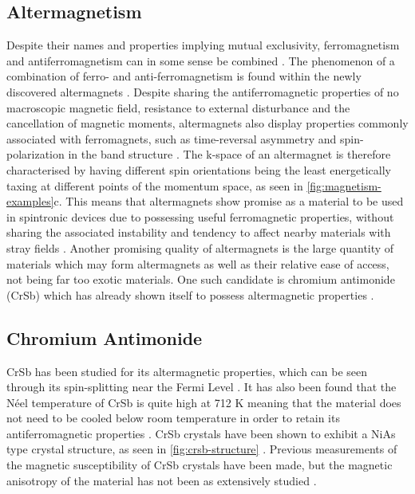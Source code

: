     \subsection{Altermagnetism}
    Despite their names and properties implying mutual exclusivity, ferromagnetism and antiferromagnetism can in some sense be combined 
    \cite{vsmejkal2022emerging}. The phenomenon of a combination of ferro- and anti-ferromagnetism is found within the newly discovered altermagnets 
    \cite{song2025altermagnets}. Despite sharing the antiferromagnetic properties of no macroscopic magnetic field, resistance to external disturbance 
    and the cancellation of magnetic moments, altermagnets also display properties commonly associated with ferromagnets, such as time-reversal 
    asymmetry and spin-polarization in the band structure \cite{vsmejkal2022emerging}. The k-space of an altermagnet is therefore characterised by 
    having different spin orientations being the least energetically taxing at different points of the momentum space, as seen in 
    \autoref{fig:magnetism-examples}c. This means that altermagnets show promise as a material to be used in spintronic devices due to possessing useful 
    ferromagnetic properties, without sharing the associated instability and tendency to affect nearby materials with stray fields 
    \cite{tamang2025altermagnetism}. Another promising quality of altermagnets is the large quantity of materials which may form altermagnets as well as 
    their relative ease of access, not being far too exotic materials. One such candidate is chromium antimonide (CrSb) which has already shown itself to 
    possess altermagnetic properties \cite{peng2025scaling}. 
    

    
    \subsection{Chromium Antimonide}
    CrSb has been studied for its altermagnetic properties, which can be seen through its spin-splitting near the Fermi Level \cite{yang2024three}. 
    It has also been found that the Néel temperature of CrSb is quite high at 712 K meaning that the material does not need to be cooled below room 
    temperature in order to retain its antiferromagnetic properties \cite{peng2025scaling}. CrSb crystals have been shown to exhibit a NiAs type crystal 
    structure, as seen in \autoref{fig:crsb-structure} \cite{yang2024three}. Previous measurements of the magnetic susceptibility of CrSb crystals have 
    been made, but the magnetic anisotropy of the material has not been as extensively studied \cite{peng2025scaling}.
    

